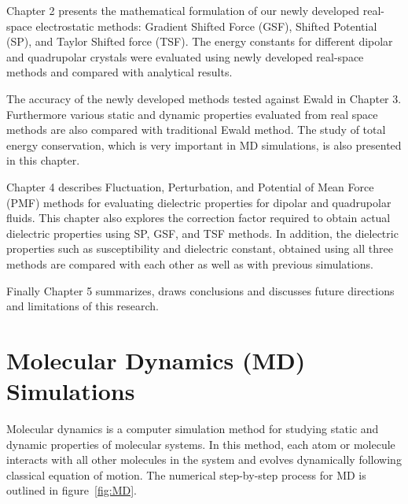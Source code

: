 Chapter 2 presents the mathematical formulation of our newly developed real-space electrostatic methods: Gradient Shifted Force (GSF), Shifted Potential (SP), and Taylor Shifted force (TSF). The energy constants for different dipolar and quadrupolar crystals were evaluated using newly developed real-space methods and compared with analytical results.

The accuracy of the newly developed methods tested against Ewald in Chapter 3. Furthermore various static and dynamic properties evaluated from real space methods are also compared with traditional Ewald method. The study of total energy conservation, which is very important in MD simulations, is also presented in this chapter. 

Chapter 4 describes Fluctuation, Perturbation, and Potential of Mean Force (PMF) methods for evaluating dielectric properties for dipolar and quadrupolar fluids. This chapter also explores the correction factor required to obtain actual dielectric properties using  SP, GSF, and TSF methods. In addition, the dielectric properties such as susceptibility and dielectric constant, obtained using all three methods are compared with each other as well as with previous simulations.

Finally Chapter 5 summarizes, draws conclusions and discusses future directions and limitations of this research. 

\section{Molecular Dynamics (MD) Simulations}

Molecular dynamics is a computer simulation method for studying static and dynamic properties of molecular systems. In this method, each atom or molecule interacts with all other molecules in the system and evolves dynamically following classical equation of motion. The numerical step-by-step process for MD is outlined in figure~\ref{fig:MD}. 
    
